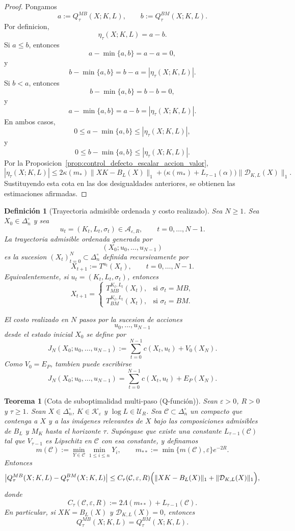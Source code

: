 ﻿\documentclass[12pt]{article}
\newtheorem{definicion}{Definición}[section]
\newtheorem{teorema}{Teorema}[section]
\begin{document}
\begin{proof}
Pongamos
\[
a:=Q_\tau^{MB}(X;K,L),
\qquad
b:=Q_\tau^{BM}(X;K,L).
\]
Por definicion,
\[
\eta_\tau(X;K,L)=a-b.
\]
Si \(a\le b\), entonces
\[
a-\min\{a,b\}=a-a=0,
\]
y
\[
b-\min\{a,b\}=b-a=|\eta_\tau(X;K,L)|.
\]
Si \(b<a\), entonces
\[
b-\min\{a,b\}=b-b=0,
\]
y
\[
a-\min\{a,b\}=a-b=|\eta_\tau(X;K,L)|.
\]
En ambos casos,
\[
0
\le
a-\min\{a,b\}
\le
|\eta_\tau(X;K,L)|,
\]
y
\[
0
\le
b-\min\{a,b\}
\le
|\eta_\tau(X;K,L)|.
\]
Por la Proposicion~\ref{prop:control_defecto_escalar_accion_valor},
\[
|\eta_\tau(X;K,L)|
\le
2\kappa(m_*)\|XK-B_L(X)\|_1
+
\bigl(\kappa(m_*)+L_{\tau-1}(\alpha)\bigr)
\|\mathcal D_{K,L}(X)\|_1.
\]
Sustituyendo esta cota en las dos desigualdades anteriores, se obtienen las estimaciones afirmadas.
\end{proof}

\begin{definicion}[Trayectoria admisible ordenada y costo realizado]\label{def:trayectoria_admisible_ordenada_costo_realizado}
Sea \(N\ge 1\). Sea \(X_0\in\Delta_n^\circ\) y sea
\[
u_t=(K_t,L_t,\sigma_t)\in\mathcal A_{\varepsilon,R},
\qquad
t=0,\dots,N-1.
\]
La trayectoria admisible ordenada generada por
\[
(X_0;u_0,\dots,u_{N-1})
\]
es la sucesion \((X_t)_{t=0}^N\subset\Delta_n^\circ\) definida recursivamente por
\[
X_{t+1}
:=
T^{u_t}(X_t),
\qquad
t=0,\dots,N-1.
\]
Equivalentemente, si \(u_t=(K_t,L_t,\sigma_t)\), entonces
\[
X_{t+1}
=
\begin{cases}
T_{MB}^{K_t,L_t}(X_t), & \text{si } \sigma_t=MB,\\[2mm]
T_{BM}^{K_t,L_t}(X_t), & \text{si } \sigma_t=BM.
\end{cases}
\]

El costo realizado en \(N\) pasos por la sucesion de acciones
\[
u_0,\dots,u_{N-1}
\]
desde el estado inicial \(X_0\) se define por
\[
J_N(X_0;u_0,\dots,u_{N-1})
:=
\sum_{t=0}^{N-1}c(X_t,u_t)
+
V_0(X_N).
\]
Como \(V_0=E_P\), tambien puede escribirse
\[
J_N(X_0;u_0,\dots,u_{N-1})
=
\sum_{t=0}^{N-1}c(X_t,u_t)
+
E_P(X_N).
\]
\end{definicion}

\begin{teorema}[Cota de suboptimalidad multi-paso (Q-función)]\label{teo:subopt_multi_paso}
Sean \(\varepsilon>0\), \(R>0\) y \(\tau\ge 1\). Sean \(X\in\Delta_n^\circ\), \(K\in\mathcal K_\varepsilon\) y \(\log L\in\mathcal U_R\). Sea \(\mathcal C\subset\Delta_n^\circ\) un compacto que contenga a \(X\) y a las imágenes relevantes de \(X\) bajo las composiciones admisibles de \(B_L\) y \(M_K\) hasta el horizonte \(\tau\). Supóngase que existe una constante \(L_{\tau-1}(\mathcal C)\) tal que \(V_{\tau-1}\) es Lipschitz en \(\mathcal C\) con esa constante, y definamos
\[
m(\mathcal C):=\min_{Y\in\mathcal C}\min_{1\le i\le n}Y_i,
\qquad
m_{**}:=\min\{m(\mathcal C),\varepsilon\}e^{-2R}.
\]
Entonces
\[
\bigl|Q_\tau^{MB}(X;K,L)-Q_\tau^{BM}(X;K,L)\bigr|
\le
C_\tau(\mathcal C,\varepsilon,R)\Bigl(\|XK-B_L(X)\|_1+\|\mathcal D_{K,L}(X)\|_1\Bigr),
\]
donde
\[
C_\tau(\mathcal C,\varepsilon,R):=2\Lambda(m_{**})+L_{\tau-1}(\mathcal C).
\]
En particular, si \(XK=B_L(X)\) y \(\mathcal D_{K,L}(X)=0\), entonces
\[
Q_\tau^{MB}(X;K,L)=Q_\tau^{BM}(X;K,L).
\]
\end{teorema}
\end{document}
